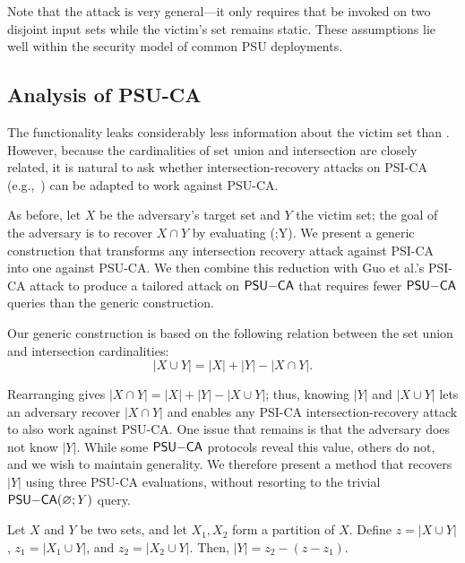 Note that the attack is very general---it only requires that 
\PSU{} be invoked on two disjoint input sets while the victim’s set remains static. These assumptions lie well within the security model of common PSU deployments.


\subsection{Analysis of PSU-CA}\label{sec:psu-ca-attack}


The \PSUCA{} functionality leaks considerably less information about the victim set than \PSU{}. However, because the cardinalities of set union and intersection are closely related,
it is natural to ask whether intersection-recovery attacks on PSI-CA (e.g.,~\cite{USENIX:GHLWJL22,NDSS:JiaDuYan24,USENIX:FalTan25}) can be adapted to work against PSU-CA.

As before, let $X$ be the adversary's target set and $Y$ the victim set; the goal of the adversary is to recover $X \cap Y$ by evaluating \PSUCA(;Y).
We present a generic construction that transforms any intersection recovery attack against PSI-CA into one against PSU-CA. We then combine this reduction with Guo et al.’s PSI-CA attack to produce a tailored attack on $\mathsf{PSU\relax{-}CA}$  that requires fewer $\mathsf{PSU\relax{-}CA}$ queries than the generic construction.

Our generic construction is based on the following relation between the set union and intersection cardinalities:
\begin{equation}
	\label{eqn:union_intersect_cardinalities}
	|X \cup Y| = |X| + |Y| - |X \cap Y|.
\end{equation}

Rearranging gives $|X\cap Y|=|X|+|Y|-|X\cup Y|$; thus, knowing $|Y|$ and $|X\cup Y|$ lets an adversary recover $|X\cap Y|$ and enables any PSI-CA intersection-recovery attack to also work against PSU-CA. One issue that remains is that the adversary does not know $|Y|$. While some $\mathsf{PSU\relax{-}CA}$ protocols reveal this value, others do not, and we wish to maintain generality. We therefore present a method that recovers $|Y|$ using three PSU-CA evaluations, without resorting to the trivial $\mathsf{PSU\relax{-}CA}(\varnothing;Y)$ query.

\begin{prop}\label{prop:PSUCA_comp_m}
Let $X$ and $Y$ be two sets, and let $X_1, X_2$ form a partition of $X$. Define $z = |X \cup Y|$, $z_1 = |X_1 \cup Y|$, and $z_2 = |X_2 \cup Y|$. Then, \(|Y| = z_2 - (z - z_1) .\)
\end{prop}

